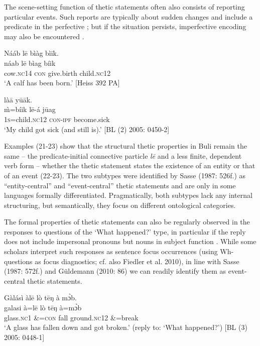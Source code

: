 \documentclass[output=paper]{langsci/langscibook}
\begin{document}
The scene-setting function of thetic statements often also consists of reporting particular events. Such reports are typically about sudden changes and include a predicate in the perfective ; but if the situation persists, imperfective encoding may also be encountered .

\ea\label{ex:schwarz:22}
\glll  Nááb    l\={e}  bìàg    bì\={i}k.\\
    \textup{náab}    l\={e}  bìag    {bíik}\\
       cow.\textsc{nc}14  \textsc{con}   give.birth  child.\textsc{nc}12\\
\glt ‘A calf has been born.’ [Heiss 392 PA]
\z

\ea\label{ex:schwarz:23}
      là\={a}    y\={u}\={a}k.\\
    \textup{\`{m}=bíik}      l\={e}-á    j\={u}ag\\
       1\textsc{s}=child.\textsc{nc}12    \textsc{con}-\textsc{ipf}  become.sick\\
\glt ‘My child got sick (and still is).’ [BL (2) 2005: 0450-2]
\z

Examples (21-23) show that the structural thetic properties in Buli remain the same – the predicate-initial connective particle \textit{l\={e}} and a less finite, dependent verb form – whether the thetic statement states the existence of an entity  or that of an event (22-23). The two subtypes were identified by Sasse (1987: 526f.) as “entity-central” and “event-central” thetic statements and are only in some languages formally differentiated. Pragmatically, both subtypes lack any internal structuring, but semantically, they focus on different ontological categories.

The formal properties of thetic statements can also be regularly observed in the responses to questions of the ‘What happened?’ type, in particular if the reply does not include impersonal pronouns but nouns in subject function . While some scholars interpret such responses as sentence focus occurrences (using Wh-questions as focus diagnostics; cf. also Fiedler et al. 2010), in line with Sasse (1987: 572f.) and Güldemann (2010: 86) we can readily identify them as event-central thetic statements. 

\ea\label{ex:schwarz:24}
\glll   Gàlásì    àl\={e}    lò  t\={e}ŋ    {à   m\`{ɔ}b}.\\
    \textup{galasi} \textup{à=l\={e}}    lò  t\={e}ŋ    {à=mɔ̀b}\\
       glass.\textsc{nc}1  \&=\textsc{con}  fall  ground.\textsc{nc}12  \&=break\\
\glt ‘A glass has fallen down and got broken.’ (reply to: ‘What happened?’) [BL (3) 2005: 0448-1]
\z
\end{document}
